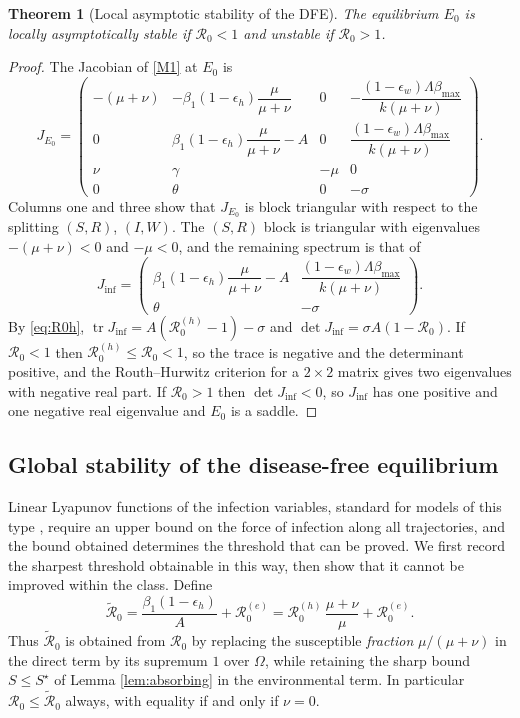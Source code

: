 \documentclass[11pt]{article}
\theoremstyle{plain}
\newtheorem{theorem}{Theorem}[section]
\theoremstyle{definition}
\theoremstyle{remark}
\newcommand{\Rz}{\mathcal{R}_0}
\newcommand{\Rzh}{\mathcal{R}_0^{(h)}}
\newcommand{\Rze}{\mathcal{R}_0^{(e)}}
\newcommand{\Rtil}{\widetilde{\mathcal{R}}_0}
\begin{document}
\begin{theorem}[Local asymptotic stability of the DFE]\label{thm:local_DFE}
The equilibrium $E_0$ is locally asymptotically stable if $\Rz<1$ and unstable if $\Rz>1$.
\end{theorem}

\begin{proof}
The Jacobian of \eqref{M1} at $E_0$ is
\[
J_{E_0}=\begin{pmatrix}
-(\mu+\nu) & -\beta_1(1-\epsilon_h)\dfrac{\mu}{\mu+\nu} & 0 & -\dfrac{(1-\epsilon_w)\Lambda\beta_{\max}}{k(\mu+\nu)}\\[8pt]
0 & \beta_1(1-\epsilon_h)\dfrac{\mu}{\mu+\nu}-A & 0 & \dfrac{(1-\epsilon_w)\Lambda\beta_{\max}}{k(\mu+\nu)}\\[8pt]
\nu & \gamma & -\mu & 0\\[4pt]
0 & \theta & 0 & -\sigma
\end{pmatrix}.
\]
Columns one and three show that $J_{E_0}$ is block triangular with respect to the splitting $(S,R)$, $(I,W)$. The $(S,R)$ block is triangular with eigenvalues $-(\mu+\nu)<0$ and $-\mu<0$, and the remaining spectrum is that of
\[
J_{\mathrm{inf}}=\begin{pmatrix}
\beta_1(1-\epsilon_h)\dfrac{\mu}{\mu+\nu}-A & \dfrac{(1-\epsilon_w)\Lambda\beta_{\max}}{k(\mu+\nu)}\\[8pt]
\theta & -\sigma
\end{pmatrix}.
\]
By \eqref{eq:R0h}, $\operatorname{tr}J_{\mathrm{inf}}=A(\Rzh-1)-\sigma$ and $\det J_{\mathrm{inf}}=\sigma A(1-\Rz)$. If $\Rz<1$ then $\Rzh\le\Rz<1$, so the trace is negative and the determinant positive, and the Routh--Hurwitz criterion for a $2\times2$ matrix gives two eigenvalues with negative real part. If $\Rz>1$ then $\det J_{\mathrm{inf}}<0$, so $J_{\mathrm{inf}}$ has one positive and one negative real eigenvalue and $E_0$ is a saddle.
\end{proof}

\subsection{Global stability of the disease-free equilibrium}\label{subsec:global}

Linear Lyapunov functions of the infection variables, standard for models of this type \cite{ShuaiDriessche2013,alsammani2023mathematical}, require an upper bound on the force of infection along all trajectories, and the bound obtained determines the threshold that can be proved. We first record the sharpest threshold obtainable in this way, then show that it cannot be improved within the class. Define
\begin{equation}\label{eq:Rtilde}
\Rtil=\frac{\beta_1(1-\epsilon_h)}{A}+\Rze=\Rzh\,\frac{\mu+\nu}{\mu}+\Rze .
\end{equation}
Thus $\Rtil$ is obtained from $\Rz$ by replacing the susceptible \emph{fraction} $\mu/(\mu+\nu)$ in the direct term by its supremum $1$ over $\Omega$, while retaining the sharp bound $S\le S^\star$ of Lemma \ref{lem:absorbing} in the environmental term. In particular $\Rz\le\Rtil$ always, with equality if and only if $\nu=0$.
\end{document}
